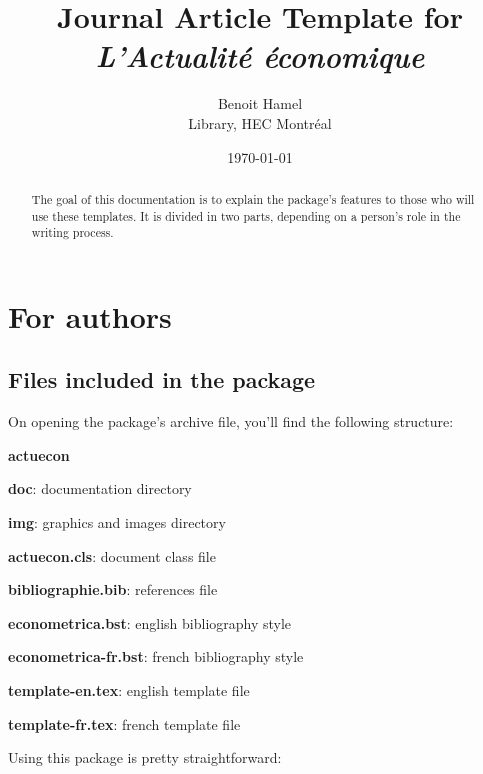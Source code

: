 \documentclass[english]{article}
\title{Journal Article Template for \emph{L'Actualité économique}}
\author{Benoit Hamel \\ Library, HEC Montréal}
\date{\today}
\begin{document}
	\maketitle
	
	\begin{abstract}
		The goal of this documentation is to explain the package's features to those who will use these
		templates. It is divided in two parts, depending on a person's role in the writing process.
	\end{abstract}
	
	\tableofcontents
		
	\section{For authors}
		\label{sec:auteurs}		
		
		\subsection{Files included in the package}
		
			On opening the package's archive file, you'll find the following structure:
			
			\begin{repertoires}
				\item \textbf{actuecon}
				\begin{repertoires}
					\item \textbf{doc}: documentation directory
					\item \textbf{img}: graphics and images directory
				\end{repertoires}
				\begin{fichiers}
					\item \textbf{actuecon.cls}: document class file
					\item \textbf{bibliographie.bib}: references file
					\item \textbf{econometrica.bst}: english bibliography style
					\item \textbf{econometrica-fr.bst}: french bibliography style
					\item \textbf{template-en.tex}: english template file
					\item \textbf{template-fr.tex}: french template file
				\end{fichiers}
			\end{repertoires}
		
			Using this package is pretty straightforward:
			
\end{document}
